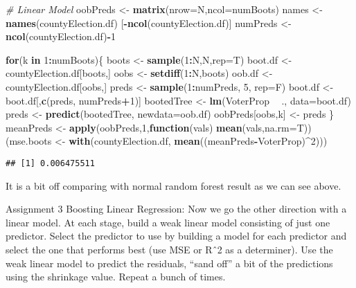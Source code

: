 \documentclass[]{article}
\newenvironment{Shaded}{\begin{snugshade}}{\end{snugshade}}
\newcommand{\CommentTok}[1]{\textcolor[rgb]{0.56,0.35,0.01}{\textit{#1}}}
\newcommand{\ControlFlowTok}[1]{\textcolor[rgb]{0.13,0.29,0.53}{\textbf{#1}}}
\newcommand{\DataTypeTok}[1]{\textcolor[rgb]{0.13,0.29,0.53}{#1}}
\newcommand{\DecValTok}[1]{\textcolor[rgb]{0.00,0.00,0.81}{#1}}
\newcommand{\KeywordTok}[1]{\textcolor[rgb]{0.13,0.29,0.53}{\textbf{#1}}}
\newcommand{\NormalTok}[1]{#1}
\newcommand{\OperatorTok}[1]{\textcolor[rgb]{0.81,0.36,0.00}{\textbf{#1}}}
\newcommand{\StringTok}[1]{\textcolor[rgb]{0.31,0.60,0.02}{#1}}
\begin{document}
\begin{Shaded}
\begin{Highlighting}[]
\CommentTok{# Linear Model}
\NormalTok{oobPreds <-}\StringTok{ }\KeywordTok{matrix}\NormalTok{(}\DataTypeTok{nrow=}\NormalTok{N,}\DataTypeTok{ncol=}\NormalTok{numBoots) }
\NormalTok{names <-}\StringTok{ }\KeywordTok{names}\NormalTok{(countyElection.df) [}\OperatorTok{-}\KeywordTok{ncol}\NormalTok{(countyElection.df)] }
\NormalTok{numPreds <-}\StringTok{ }\KeywordTok{ncol}\NormalTok{(countyElection.df)}\OperatorTok{-}\DecValTok{1}

\ControlFlowTok{for}\NormalTok{(k }\ControlFlowTok{in} \DecValTok{1}\OperatorTok{:}\NormalTok{numBoots)\{}
\NormalTok{  boots <-}\StringTok{ }\KeywordTok{sample}\NormalTok{(}\DecValTok{1}\OperatorTok{:}\NormalTok{N,N,}\DataTypeTok{rep=}\NormalTok{T)}
\NormalTok{  boot.df <-}\StringTok{ }\NormalTok{countyElection.df[boots,]}
\NormalTok{  oobs <-}\StringTok{ }\KeywordTok{setdiff}\NormalTok{(}\DecValTok{1}\OperatorTok{:}\NormalTok{N,boots)}
\NormalTok{  oob.df <-}\StringTok{ }\NormalTok{countyElection.df[oobs,]}
\NormalTok{  preds <-}\StringTok{ }\KeywordTok{sample}\NormalTok{(}\DecValTok{1}\OperatorTok{:}\NormalTok{numPreds, }\DecValTok{5}\NormalTok{, }\DataTypeTok{rep=}\NormalTok{F)}
\NormalTok{  boot.df <-}\StringTok{ }\NormalTok{boot.df[,}\KeywordTok{c}\NormalTok{(preds, numPreds}\OperatorTok{+}\DecValTok{1}\NormalTok{)] }
\NormalTok{  bootedTree <-}\StringTok{ }\KeywordTok{lm}\NormalTok{(VoterProp }\OperatorTok{~}\StringTok{ }\NormalTok{.,}
                   \DataTypeTok{data=}\NormalTok{boot.df)}
\NormalTok{  preds <-}\StringTok{ }\KeywordTok{predict}\NormalTok{(bootedTree, }\DataTypeTok{newdata=}\NormalTok{oob.df)}
\NormalTok{  oobPreds[oobs,k] <-}\StringTok{ }\NormalTok{preds }
\NormalTok{\}}
\NormalTok{meanPreds <-}\StringTok{ }\KeywordTok{apply}\NormalTok{(oobPreds,}\DecValTok{1}\NormalTok{,}\ControlFlowTok{function}\NormalTok{(vals) }\KeywordTok{mean}\NormalTok{(vals,}\DataTypeTok{na.rm=}\NormalTok{T))}
\NormalTok{(mse.boots <-}\StringTok{ }\KeywordTok{with}\NormalTok{(countyElection.df, }\KeywordTok{mean}\NormalTok{((meanPreds}\OperatorTok{-}\NormalTok{VoterProp)}\OperatorTok{^}\DecValTok{2}\NormalTok{)))}
\end{Highlighting}
\end{Shaded}

\begin{verbatim}
## [1] 0.006475511
\end{verbatim}

It is a bit off comparing with normal random forest result as we can see
above.

Assignment 3 Boosting Linear Regression: Now we go the other direction
with a linear model. At each stage, build a weak linear model consisting
of just one predictor. Select the predictor to use by building a model
for each predictor and select the one that performs best (use MSE or Rˆ2
as a determiner). Use the weak linear model to predict the residuals,
``sand off'' a bit of the predictions using the shrinkage value. Repeat
a bunch of times.
\end{document}
